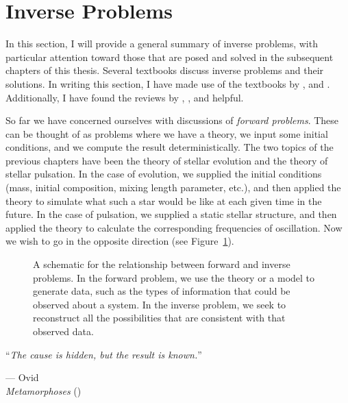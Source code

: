 \section{Inverse Problems} 
\label{sec:inverse}
\begin{shaded}
\noindent In this section, I will provide a general summary of inverse problems, with particular attention toward those that are posed and solved in the subsequent chapters of this thesis. 
Several textbooks discuss inverse problems and their solutions. 
In writing this section, I have made use of the textbooks by \citet{basuchaplin2017}, \citet{kirsch2011introduction} and \citet{neto2012introduction}. 
Additionally, I have found the reviews by \citet{tenorio2001statistical}, \citet{GoughThompson1991}, and \citet{2018ASSP...49...75R} helpful. 
\end{shaded}

So far we have concerned ourselves with discussions of \emph{forward problems}. 
These can be thought of as problems where we have a theory, we input some initial conditions, and we compute the result deterministically. 
The two topics of the previous chapters have been the theory of stellar evolution and the theory of stellar pulsation. 
In the case of evolution, we supplied the initial conditions (mass, initial composition, mixing length parameter, etc.), and then applied the theory to simulate what such a star would be like at each given time in the future. 
In the case of pulsation, we supplied a static stellar structure, and then applied the theory to calculate the corresponding frequencies of oscillation. 
Now we wish to go in the opposite direction (see Figure~\ref{fig:forward-inverse}). 

\begin{figure}
    \centering
    
    \caption[Forward and Inverse Problems]{A schematic for the relationship between forward and inverse problems. 
            In the forward problem, we use the theory or a model to generate data, such as the types of information that could be observed about a system. 
            In the inverse problem, we seek to reconstruct all the possibilities that are consistent with that observed data. 
        \label{fig:forward-inverse}}
\end{figure}

\epigraph{``\emph{The cause is hidden, but the result is known.}''}{--- Ovid\\\emph{Metamorphoses} (\citeyear{ovid})}


